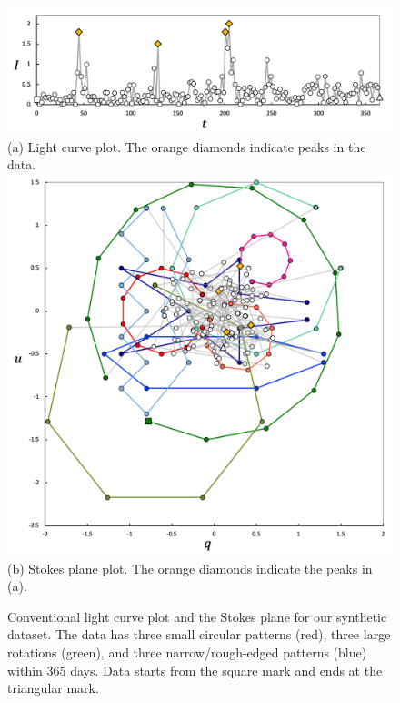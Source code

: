 \begin{figure}[t]
    \centering
    \vspace{3mm}
    \includegraphics[width=.8\linewidth]{vgtc_journal_latex/figures/synthesisDataLightCurveLabel_revised.png}\\
    \footnotesize{\sf (a) Light curve plot. The orange diamonds indicate peaks in the data.}\\
    \includegraphics[width=.83\linewidth]{vgtc_journal_latex/figures/synthesisDataStokesLabel_revised.png}\\
    \footnotesize{\sf (b) Stokes plane plot. The orange diamonds indicate the peaks in (a).}
    \caption{Conventional light curve plot and the Stokes plane for our synthetic dataset. The data has three small circular patterns (red), three large rotations (green), and three narrow/rough-edged patterns (blue) within 365 days. Data starts from the square mark and ends at the triangular mark.}
    \label{fig:synthesisData}
\end{figure}





